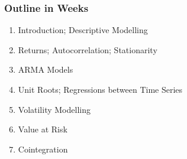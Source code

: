 \begin{frame}%
\frametitle{Outline in Weeks}
\begin{enumerate}
\item Introduction; Descriptive Modelling
\item Returns; Autocorrelation; Stationarity
\item ARMA Models
\item Unit Roots; Regressions between Time Series
\item Volatility Modelling
\item Value at Risk
\item Cointegration
\end{enumerate}
\end{frame}%